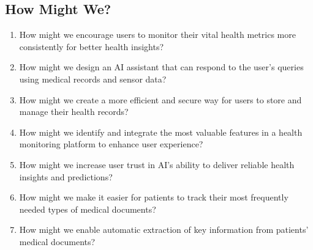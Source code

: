 \subsection{How Might We?}
\begin{enumerate}
    \item How might we encourage users to monitor their vital health metrics more consistently for better health insights?
    \item How might we design an AI assistant that can respond to the user's queries using medical records and sensor data?
    \item How might we create a more efficient and secure way for users to store and manage their health records?
    \item How might we identify and integrate the most valuable features in a health monitoring platform to enhance user experience?
    \item How might we increase user trust in AI's ability to deliver reliable health insights and predictions?
    \item How might we make it easier for patients to track their most frequently needed types of medical documents?
    \item How might we enable automatic extraction of key information from patients' medical documents?
\end{enumerate} 